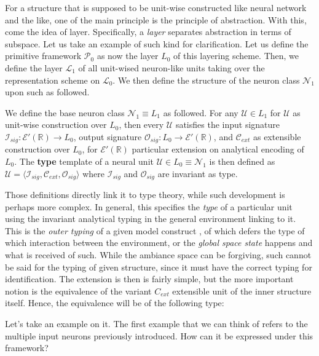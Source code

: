 For a structure that is supposed to be unit-wise constructed like neural network and the like, one of the main principle is the principle of abstraction. With this, come the idea of layer. Specifically, a \textit{layer} separates abstraction in terms of subspace. Let us take an example of such kind for clarification. Let us define the primitive framework $\mathcal{P}_{0}$ as now the layer $L_{0}$ of this layering scheme. Then, we define the layer $\mathcal{L}_{1}$ of all unit-wised neuron-like units taking over the representation scheme on $\mathcal{L}_{0}$. We then define the structure of the neuron class $\mathcal{N}_{1}$ upon such as followed. 

\begin{definition}
    We define the base neuron class $\mathcal{N}_{1}\equiv L_{1}$ as followed. For any $\mathcal{U}\in L_{1}$ for $\mathcal{U}$ as unit-wise construction over $L_{0}$, then every $\mathcal{U}$ satisfies the input signature $\mathcal{I}_{sig}:\mathcal{E}'(\mathbb{R})\to L_{0}$, output signature $\mathcal{O}_{sig}:L_{0}\to\mathcal{E}'(\mathbb{R})$, and $\mathcal{C}_{ext}$ as extensible construction over $L_{0}$, for $\mathcal{E}'(\mathbb{R})$ particular extension on analytical encoding of $L_{0}$. The \textbf{type} template of a neural unit $\mathcal{U}\in L_{0}\equiv \mathcal{N}_{1}$ is then defined as $\mathcal{U}=\langle \mathcal{I}_{sig},\mathcal{C}_{ext},\mathcal{O}_{sig}\rangle$ where $\mathcal{I}_{sig}$ and $\mathcal{O}_{sig}$ are invariant as type. 
\end{definition}

Those definitions directly link it to type theory, while such development is perhaps more complex. In general, this specifies the \textit{type} of a particular unit using the invariant analytical typing in the general environment linking to it. This is the \textit{outer typing} of a given model construct , of which defers the type of which interaction between the environment, or the \textit{global space state} happens and what is received of such. While the ambiance space can be forgiving, such cannot be said for the typing of given structure, since it must have the correct typing for identification. The extension is then is fairly simple, but the more important notion is the equivalence of the variant $C_{ext}$ extensible unit of the inner structure itself. Hence, the equivalence will be of the following type: 



Let's take an example on it. The first example that we can think of refers to the multiple input neurons previously introduced. How can it be expressed under this framework? 

